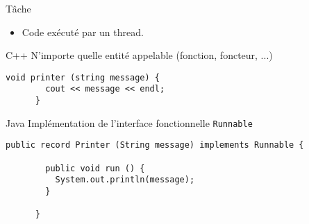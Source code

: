 
\begingroup

\begin{frame}[fragile]{Tâche}

  \begin{itemize}
  \item Code exécuté par un thread.
  \end{itemize}

  \begin{exampleblock}{C++}
    N'importe quelle entité appelable (fonction, foncteur, ...)
    \begin{lstlisting}[gobble=6]
      void printer (string message) {
        cout << message << endl;
      }
    \end{lstlisting}
  \end{exampleblock}

  \begin{exampleblock}{Java}
    Implémentation de l'interface fonctionnelle \lstinline{Runnable}
    \begin{lstlisting}[gobble=6]
      public record Printer (String message) implements Runnable {

        public void run () {
          System.out.println(message);
        }

      }
    \end{lstlisting}
  \end{exampleblock}
\end{frame}

\endgroup
\endinput

